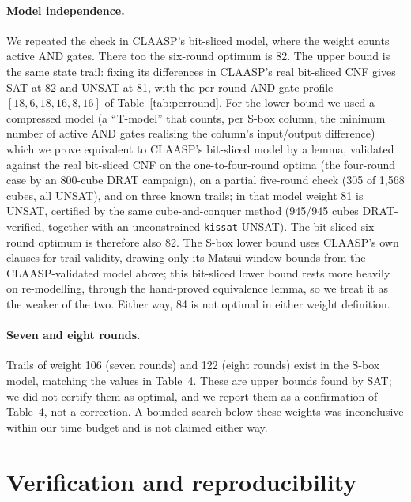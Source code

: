 \documentclass[11pt]{article}
\begin{document}
\paragraph{Model independence.}
\label{sec:modelind}
We repeated the check in CLAASP's bit-sliced model, where the weight counts active AND gates. There too the six-round optimum is 82. The upper bound is the same state trail: fixing its differences in CLAASP's real bit-sliced CNF gives SAT at 82 and UNSAT at 81, with the per-round AND-gate profile $[18,6,18,16,8,16]$ of Table~\ref{tab:perround}. For the lower bound we used a compressed model (a ``T-model'' that counts, per S-box column, the minimum number of active AND gates realising the column's input/output difference) which we prove equivalent to CLAASP's bit-sliced model by a lemma, validated against the real bit-sliced CNF on the one-to-four-round optima (the four-round case by an 800-cube DRAT campaign), on a partial five-round check (305 of 1{,}568 cubes, all UNSAT), and on three known trails; in that model weight 81 is UNSAT, certified by the same cube-and-conquer method (945/945 cubes DRAT-verified, together with an unconstrained \texttt{kissat} UNSAT). The bit-sliced six-round optimum is therefore also 82. The S-box lower bound uses CLAASP's own clauses for trail validity, drawing only its Matsui window bounds from the CLAASP-validated model above; this bit-sliced lower bound rests more heavily on re-modelling, through the hand-proved equivalence lemma, so we treat it as the weaker of the two. Either way, 84 is not optimal in either weight definition.

\paragraph{Seven and eight rounds.} Trails of weight 106 (seven rounds) and 122 (eight rounds) exist in the S-box model, matching the values in Table~4. These are upper bounds found by SAT; we did not certify them as optimal, and we report them as a confirmation of Table~4, not a correction. A bounded search below these weights was inconclusive within our time budget and is not claimed either way.

\section{Verification and reproducibility}
\label{sec:verify}
\end{document}
